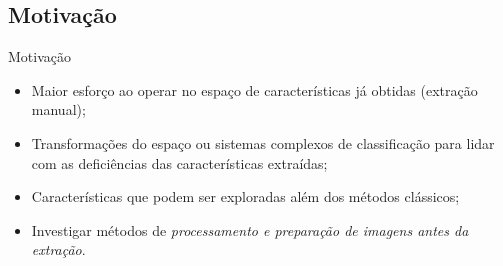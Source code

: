 \documentclass[10pt]{beamer}
\begin{document}
\subsection{Motivação}
\begin{frame}{Motivação}
  \setlength\leftmargini{1em}
    \begin{itemize}
    \item Maior esforço ao operar no espaço de características já obtidas (extração manual);
    \item Transformações do espaço ou sistemas complexos de classificação para lidar com as deficiências das características extraídas;
    \item Características que podem ser exploradas além dos métodos clássicos;
    \item Investigar métodos de \textit{processamento e preparação de imagens antes da extração}.
  \end{itemize}
\end{frame}
\end{document}
